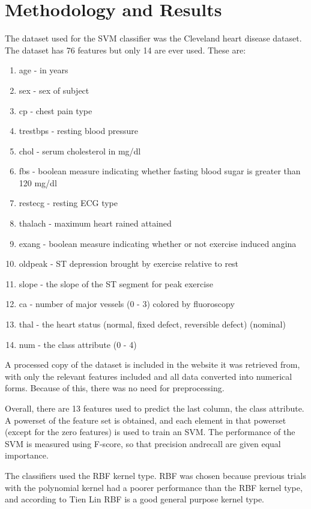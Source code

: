 \documentclass[conference]{IEEEtran}
\begin{document}
\section{Methodology and Results}
	The dataset used for the SVM classifier was the Cleveland heart disease dataset.
	The dataset has 76 features but only 14 are ever used. These are:
	\begin{enumerate}[start=0]
	  \item age - in years
      \item sex - sex of subject     
      \item cp - chest pain type
      \item trestbps - resting blood pressure
      \item chol - serum cholesterol in mg/dl
	  \item fbs - boolean measure indicating whether fasting blood sugar is greater than 120 mg/dl
      \item restecg - resting ECG type
      \item thalach - maximum heart rained attained
      \item exang - boolean measure indicating whether or not exercise induced angina
      \item oldpeak - ST depression brought by exercise relative to rest
      \item slope - the slope of the ST segment for peak exercise
	  \item ca - number of major vessels (0 - 3) colored by fluoroscopy        
      \item thal - the heart status (normal, fixed defect, reversible defect) (nominal) 
	  \item num - the class attribute (0 - 4) 
	\end{enumerate}
	A processed copy of the dataset is included in the website it was retrieved from, with only the relevant features included and all data converted into numerical forms.
	Because of this, there was no need for preprocessing.

	Overall, there are 13 features used to predict the last column, the class attribute.
	A powerset of the feature set is obtained, and each element in that powerset (except for the zero features) is used to train an SVM.
	The performance of the SVM is measured using F-score, so that precision andrecall are given equal importance.

	The classifiers used the RBF kernel type.
	RBF was chosen because previous trials with the polynomial kernel had a poorer performance than the RBF kernel type, and according to Tien Lin \cite{bib:rbf} RBF is a good general purpose kernel type.
\end{document}
